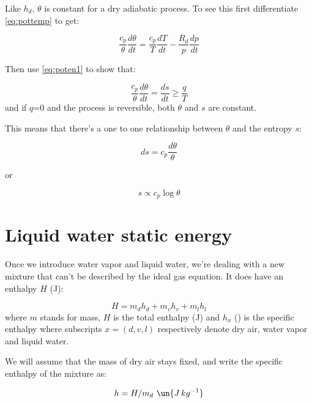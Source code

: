 \documentclass[12pt]{article}
\begin{document}
Like $h_d$, $\theta$ is constant for a dry adiabatic process. To see this
first  differentiate \eqref{eq:pottemp} to get:

\begin{equation}
  \label{eq:differ}
\frac{c_p}{\theta} \frac{d \theta} {dt} =  \frac{c_p}{T} \frac{dT}{dt} - \frac{R_d }{ p} \frac{dp}{dt}
\end{equation}

Then use \eqref{eq:poten1} to show that:

\begin{equation}
  \label{eq:thetaIsS}
  \frac{c_p}{\theta} \frac{d \theta} {dt} = \frac{ds} {dt} \geq \frac{q}{T}
\end{equation}
and if $q$=0 and the process is reversible, both $\theta$ and $s$ are constant.

This means that there's a one to one relationship between $\theta$ and the
entropy $s$:

\begin{equation}
  \label{eq:entrop1}
  ds = c_p \frac{d \theta}{\theta}
\end{equation}

or 

\begin{equation}
  \label{eq:entrop2}
  s \propto  c_p \log \theta
\end{equation}

\section{Liquid water static energy}
\label{sec:liquid-water-static}


Once we introduce water vapor and liquid water, we're dealing
with a new mixture that can't be described by the ideal gas equation.
It does have an enthalpy $H$ (J):

\begin{equation}
  \label{eq:hmix}
  H=m_d h_d + m_v h_v + m_l h_l
\end{equation}
where $m$ stands for mass, $H$ is the total enthalpy (J) and $h_x$ 
() is the specific enthalpy where
subscripts $x=(d,v,l)$ respectively denote dry air, water vapor
and liquid water. 

We will assume that the mass of dry air stays fixed, and
write the specific enthalpy of the mixture as:

\begin{equation}
  \label{eq:mix}
  h = H/m_d\ \un{J\,kg^{-1}}
\end{equation}
\end{document}
